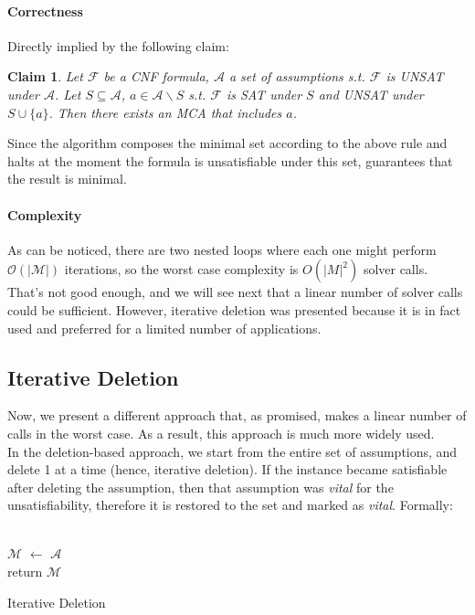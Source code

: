 \documentclass[]{article}
\newtheorem{claim}  {Claim}
\begin{document}
	\paragraph{Correctness} Directly implied by the following claim:
	\begin{claim}
		Let $ \mathcal{F} $ be a CNF formula, $ \mathcal{A} $ a set of assumptions s.t. $ \mathcal{F} $ is UNSAT under $ \mathcal{A} $. Let $ S \subseteq \mathcal{A} $, $ a \in \mathcal{A} \backslash S $ s.t. $ \mathcal{F} $ is SAT under $ S $ and UNSAT under $ S \cup \{a\} $. Then there exists an MCA that includes $ a $.
	\end{claim}
	Since the algorithm composes the minimal set according to the above rule and halts at the moment the formula is unsatisfiable under this set, guarantees that the result is minimal.
	\paragraph{Complexity} As can be noticed, there are two nested loops where each one might perform $ \mathcal{O \left( | M |\right) } $ iterations, so the worst case complexity is $ O \left( | M |^\text{2} \right) $ solver calls. That's not good enough, and we will see next that a linear number of solver calls could be sufficient. However, iterative deletion was presented because it is in fact used and preferred for a limited number of applications.
	
	\subsection{Iterative Deletion}
	Now, we present a different approach that, as promised, makes a linear number of calls in the worst case. As a result, this approach is much more widely used.\\
	In the deletion-based approach, we start from the entire set of assumptions, and delete 1 at a time (hence, iterative deletion). If the instance became satisfiable after deleting the assumption, then that assumption was \textit{vital} for the unsatisfiability, therefore it is restored to the set and marked as \textit{vital}. Formally:\\\\
		\begin{algorithm}[H]
			$ \mathcal{M} $ $\leftarrow$ $ \mathcal{A} $\\
			return $ \mathcal{M} $
			\caption{Iterative Deletion}
		\end{algorithm}
		
\end{document}
